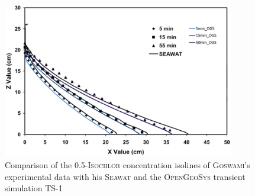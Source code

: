 

\begin{figure}
 \centering 
 \includegraphics[width=0.9\textwidth] {PART_III/DDF/figures/goswami_comp_OGS_SeaWat_TS-1.eps}
 \caption{Comparison of the 0.5-\textsc{Isochlor} concentration isolines of \textsc{Goswami}'s experimental data with his \textsc{Seawat} and the \textsc{OpenGeoSys} transient simulation TS-1}
 \label{dp:goswami_comp_OGS_SeaWat_TS-1}
\end{figure}



